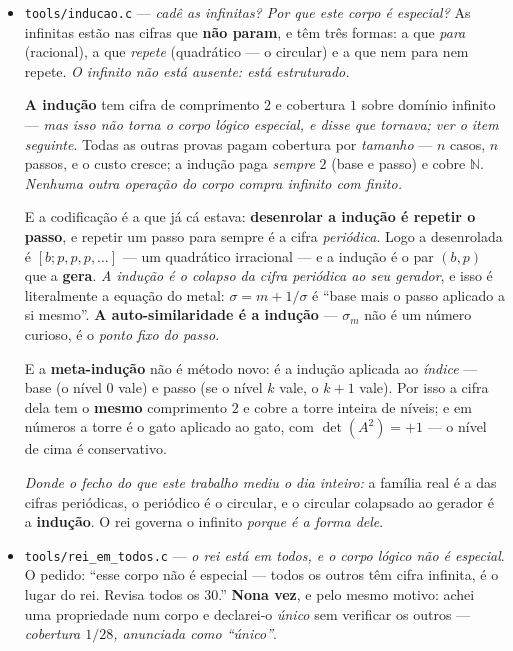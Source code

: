 \documentclass[11pt]{article}
\newcommand{\code}[1]{\texttt{\small #1}}
\theoremstyle{plain}
\theoremstyle{remark}
\begin{document}
\begin{itemize}
E a medida derrubou-me outra vez, com proveito: ia afirmar que ``decifrar devolve os passos
\emph{exatos}'', e a fração contínua \textbf{não é única} --- $[a_0;\dots,a_k,1]$ é o mesmo número
que $[a_0;\dots,a_k{+}1]$. Na leitura das provas isso é bom: \emph{um passo final de $1$ é um passo
vacuoso}, e a cifra absorve-o --- duas demonstrações que só diferem num passo vazio no fim são a
\emph{mesma} demonstração, e a cifra di-lo. A cifra é única sobre as provas \textbf{canónicas}: as
que não terminam em passo vazio.
\item \code{tools/inducao.c} --- \emph{cadê as infinitas? Por que este corpo é especial?} As
infinitas estão nas cifras que \textbf{não param}, e têm três formas: a que \emph{para} (racional),
a que \emph{repete} (quadrático --- o circular) e a que nem para nem repete. \emph{O infinito não
está ausente: está estruturado.}

\textbf{A indução} tem cifra de comprimento $2$ e cobertura $1$ sobre domínio infinito ---
\emph{mas isso não torna o corpo lógico especial, e disse que tornava; ver o item seguinte}. Todas as outras provas pagam cobertura por
\emph{tamanho} --- $n$ casos, $n$ passos, e o custo cresce; a indução paga \emph{sempre} $2$ (base
e passo) e cobre $\mathbb{N}$. \emph{Nenhuma outra operação do corpo compra infinito com finito.}

E a codificação é a que já cá estava: \textbf{desenrolar a indução é repetir o passo}, e repetir
um passo para sempre é a cifra \emph{periódica}. Logo a desenrolada é $[b;p,p,p,\dots]$ --- um
quadrático irracional --- e a indução é o par $(b,p)$ que a \textbf{gera}. \emph{A indução é o
colapso da cifra periódica ao seu gerador}, e isso é literalmente a equação do metal:
$\sigma = m + 1/\sigma$ é ``base mais o passo aplicado a si mesmo''. \textbf{A auto-similaridade
é a indução} --- $\sigma_m$ não é um número curioso, é o \emph{ponto fixo do passo}.

E a \textbf{meta-indução} não é método novo: é a indução aplicada ao \emph{índice} --- base (o
nível $0$ vale) e passo (se o nível $k$ vale, o $k{+}1$ vale). Por isso a cifra dela tem o
\textbf{mesmo} comprimento $2$ e cobre a torre inteira de níveis; e em números a torre é o gato
aplicado ao gato, com $\det(A^2) = +1$ --- o nível de cima é conservativo.

\emph{Donde o fecho do que este trabalho mediu o dia inteiro:} a família real é a das cifras
periódicas, o periódico é o circular, e o circular colapsado ao gerador é a \textbf{indução}. O
rei governa o infinito \emph{porque é a forma dele}.
\item \code{tools/rei\_em\_todos.c} --- \emph{o rei está em todos, e o corpo lógico não é
especial}. O pedido: ``esse corpo não é especial --- todos os outros têm cifra infinita, é o lugar
do rei. Revisa todos os $30$.'' \textbf{Nona vez}, e pelo mesmo motivo: achei uma propriedade num
corpo e declarei-o \emph{único} sem verificar os outros --- \emph{cobertura $1/28$, anunciada como
``único''}.


\end{itemize}
\end{document}
